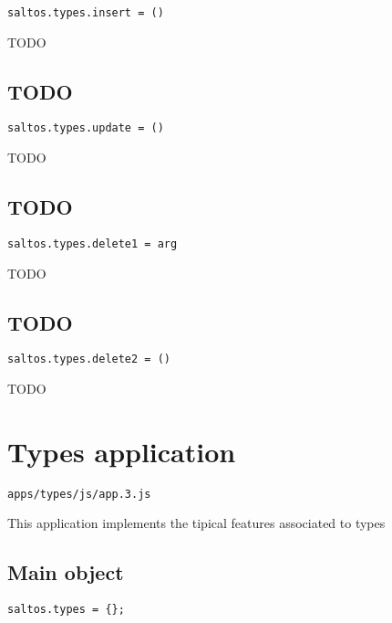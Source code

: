 \documentclass[a4paper]{book}
\begin{document}
\begin{lstlisting}
saltos.types.insert = ()
\end{lstlisting}

TODO

\hypertarget{toc127}{}
\subsection{TODO}

\begin{lstlisting}
saltos.types.update = ()
\end{lstlisting}

TODO

\hypertarget{toc128}{}
\subsection{TODO}

\begin{lstlisting}
saltos.types.delete1 = arg
\end{lstlisting}

TODO

\hypertarget{toc129}{}
\subsection{TODO}

\begin{lstlisting}
saltos.types.delete2 = ()
\end{lstlisting}

TODO

\hypertarget{toc130}{}
\section{Types application}

\begin{lstlisting}
apps/types/js/app.3.js
\end{lstlisting}

This application implements the tipical features associated to types

\hypertarget{toc131}{}
\subsection{Main object}

\begin{lstlisting}
saltos.types = {};
\end{lstlisting}
\end{document}
